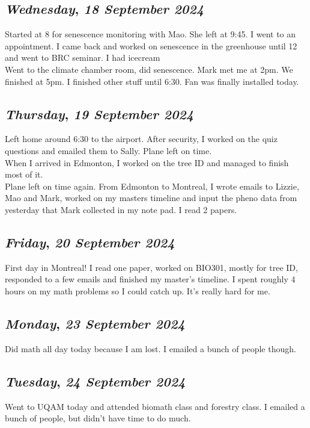 \def\day{\textit{18 September 2024}}
\def\weekday{\textit{Wednesday}}
\subsection*{\weekday, \day}
Started at 8 for senescence monitoring with Mao. She left at 9:45. I went to an appointment. I came back and worked on senescence in the greenhouse until 12 and went to BRC seminar. I had icecream\\
Went to the climate chamber room, did senescence. Mark met me at 2pm. We finished at 5pm. I finished other stuff until 6:30. Fan was finally installed today. 

\def\day{\textit{19 September 2024}}
\def\weekday{\textit{Thursday}}
\subsection*{\weekday, \day}
Left home around 6:30 to the airport. After security, I worked on the quiz questions and emailed them to Sally. Plane left on time. \\
When I arrived in Edmonton, I worked on the tree ID and managed to finish most of it.\\
Plane left on time again. From Edmonton to Montreal, I wrote emails to Lizzie, Mao and Mark, worked on my masters timeline and input the pheno data from yesterday that Mark collected in my note pad. I read 2 papers. 

\def\day{\textit{20 September 2024}}
\def\weekday{\textit{Friday}}
\subsection*{\weekday, \day}
First day in Montreal! I read one paper, worked on BIO301, mostly for tree ID, responded to a few emails and finished my master's timeline. I spent roughly 4 hours on my math problems so I could catch up. It's really hard for me. 

\def\day{\textit{23 September 2024}}
\def\weekday{\textit{Monday}}
\subsection*{\weekday, \day}
Did math all day today because I am lost. I emailed a bunch of people though.  

\def\day{\textit{24 September 2024}}
\def\weekday{\textit{Tuesday}}
\subsection*{\weekday, \day}
Went to UQAM today and attended biomath class and forestry class. I emailed a bunch of people, but didn't have time to do much. 

